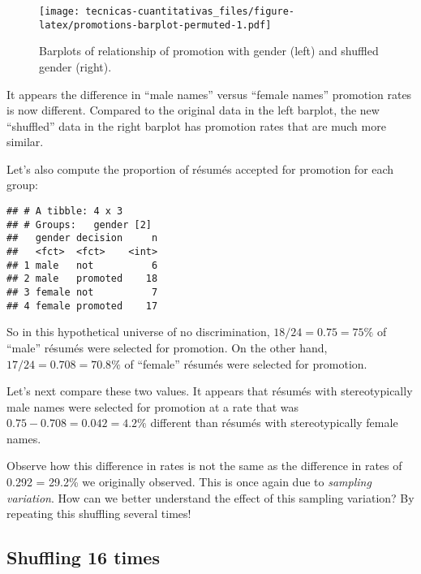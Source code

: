 \documentclass[
]{book}
\newenvironment{Shaded}{\begin{snugshade}}{\end{snugshade}}
\newcommand{\CommentTok}[1]{\textcolor[rgb]{0.56,0.35,0.01}{\textit{#1}}}
\newcommand{\KeywordTok}[1]{\textcolor[rgb]{0.13,0.29,0.53}{\textbf{#1}}}
\newcommand{\NormalTok}[1]{#1}
\newcommand{\OperatorTok}[1]{\textcolor[rgb]{0.81,0.36,0.00}{\textbf{#1}}}
\newcommand{\StringTok}[1]{\textcolor[rgb]{0.31,0.60,0.02}{#1}}
\begin{document}
\begin{figure}
\centering
\texttt{[image: tecnicas-cuantitativas\_files/figure-latex/promotions-barplot-permuted-1.pdf]}
\caption{\label{fig:promotions-barplot-permuted}Barplots of relationship of promotion with gender (left) and shuffled gender (right).}
\end{figure}

It appears the difference in ``male names'' versus ``female names'' promotion rates is now different. Compared to the original data in the left barplot, the new ``shuffled'' data in the right barplot has promotion rates that are much more similar.

Let's also compute the proportion of résumés accepted for promotion for each group:

\begin{Shaded}
\end{Shaded}

\begin{verbatim}
## # A tibble: 4 x 3
## # Groups:   gender [2]
##   gender decision     n
##   <fct>  <fct>    <int>
## 1 male   not          6
## 2 male   promoted    18
## 3 female not          7
## 4 female promoted    17
\end{verbatim}

So in this hypothetical universe of no discrimination, \(18/24 = 0.75 = 75\%\) of ``male'' résumés were selected for promotion. On the other hand, \(17/24 = 0.708 = 70.8\%\) of ``female'' résumés were selected for promotion.

Let's next compare these two values. It appears that résumés with stereotypically male names were selected for promotion at a rate that was \(0.75 - 0.708 = 0.042 = 4.2\%\) different than résumés with stereotypically female names.

Observe how this difference in rates is not the same as the difference in rates of 0.292 = 29.2\% we originally observed. This is once again due to \emph{sampling variation}. How can we better understand the effect of this sampling variation? By repeating this shuffling several times!

\hypertarget{shuffling-16-times}{%
\subsection{Shuffling 16 times}\label{shuffling-16-times}}
\end{document}
